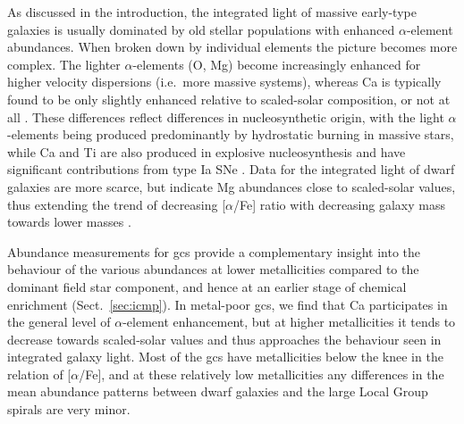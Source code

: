 \documentclass{aa}
\begin{document}
As discussed in the introduction, the integrated light of massive early-type galaxies is usually dominated by old stellar populations with enhanced $\alpha$-element abundances.
When broken down by individual elements the picture becomes more complex. The lighter $\alpha$-elements (O, Mg) become increasingly enhanced for higher velocity dispersions (i.e.\ more massive systems), whereas Ca is typically found to be only slightly enhanced relative to scaled-solar composition, or not at all \citep{Conroy2014,Worthey2014}. These differences reflect differences in nucleosynthetic origin, with the light $\alpha$-elements being produced predominantly by hydrostatic burning in massive stars, while Ca and Ti are also produced in explosive nucleosynthesis and have significant contributions from type Ia SNe \citep{Woosley1995,McWilliam2013,Kobayashi2020}. Data for the integrated light of dwarf galaxies are more scarce, but indicate Mg abundances close to scaled-solar values, thus extending the trend of decreasing [$\alpha$/Fe] ratio with decreasing galaxy mass towards lower masses \citep{Gorgas1997,Sen2018}.

Abundance measurements for \acp{gc} provide a complementary insight into the behaviour of the various abundances at lower metallicities compared to the dominant field star component, and hence at an earlier stage of chemical enrichment (Sect.~\ref{sec:icmp}).
In metal-poor \acp{gc}, we find that Ca participates in the general level of $\alpha$-element enhancement, but at higher metallicities it tends to decrease towards scaled-solar values and thus approaches the behaviour seen in integrated galaxy light. 
Most of the \acp{gc} have metallicities below the knee in the relation of [$\alpha$/Fe], and at these relatively low metallicities any differences in the mean abundance patterns between dwarf galaxies and the large Local Group spirals are very minor. 
\end{document}
